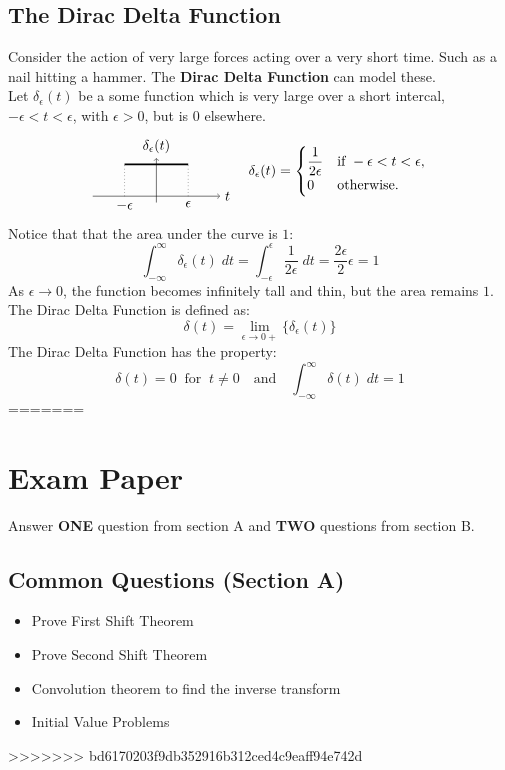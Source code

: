 \documentclass[a4paper, 10pt]{article}
\begin{document}
\subsection{The Dirac Delta Function}
Consider the action of very large forces acting over a very short time. Such as a nail hitting a hammer. The \textbf{Dirac Delta Function} can model these. \\
Let $\delta_{\epsilon}(t)$ be a some function which is very large over a short intercal, $-\epsilon < t < \epsilon$, with $\epsilon > 0$, but is $0$ elsewhere.
$$
  \begin{array}{r@{\quad}l}
    \begin{tikzpicture}[scale=0.8, baseline={(current bounding box.center)}]
      \pgfmathsetmacro{\eps}{1} %
      \pgfmathsetmacro{\hgt}{1/(\eps)}
      \draw[->] (-2,0) -- (2,0) node[right] {$t$};
      \draw[->] (0,-0.2) -- (0,1.2) node[above] {$\delta_{\epsilon}(t)$};
      \draw[line width=1.2pt] (-\eps,\hgt) -- (\eps,\hgt);
      \draw[dotted] (-\eps,0) -- (-\eps,\hgt);
      \draw[dotted] (\eps,0) -- (\eps,\hgt);
      \node[below] at (-\eps,0) {$-\epsilon$};
      \node[below] at (\eps,0) {$\epsilon$};
    \end{tikzpicture}
     &
    \delta_{\epsilon}(t)=
    \begin{cases}
      \dfrac{1}{2\epsilon} & \text{if } -\epsilon < t < \epsilon, \\
      0                    & \text{otherwise.}
    \end{cases}
  \end{array}
$$
Notice that that the area under the curve is $1$:
$$\int_{-\infty}^{\infty} \delta_{\epsilon}(t)\; dt = \int_{-\epsilon}^{\epsilon} \frac{1}{2 \epsilon} \; dt = \frac{2\epsilon}2{\epsilon}  = 1$$
As $\epsilon \to 0$, the function becomes infinitely tall and thin, but the area remains $1$. The Dirac Delta Function is defined as:
$$\delta(t) = \lim_{\epsilon \to 0+} \{\delta_{\epsilon}(t)\}$$
The Dirac Delta Function has the property:
$$\delta(t) = 0 \;\; \text{for} \;\; t \neq 0 \quad \text{and} \quad \int_{-\infty}^{\infty} \delta(t) \; dt = 1$$
=======

\section{Exam Paper}
Answer \textbf{ONE} question from section A and \textbf{TWO} questions from section B. \\ 
\subsection{Common Questions (Section A)}
\begin{itemize}
  \item Prove First Shift Theorem
  \item Prove Second Shift Theorem
  \item Convolution theorem to find the inverse transform 
  \item Initial Value Problems
\end{itemize}
>>>>>>> bd6170203f9db352916b312ced4c9eaff94e742d
\end{document}
